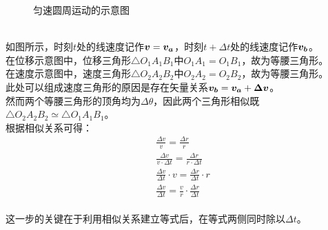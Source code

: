 \documentclass[UTF8]{ctexart}
\newcommand*{\veb}[1]{\vb*{#1}}
\begin{document}
\begin{figure}[h]
\begin{center}
{\begin{minipage}[t]{0.27\linewidth}
                \end{minipage}
            }
            \caption{匀速圆周运动的示意图}
        \end{center}
    \end{figure}\\
    如图所示，时刻$t$处的线速度记作$\veb{v}=\veb{v_a}$，时刻$t+\Delta t$处的线速度记作$\veb{v_b}$。\\[3mm]
    在位移示意图中，位移三角形$\triangle O_1A_1B_1$中$O_1A_1=O_1B_1$，故为等腰三角形。\\[3mm]
    在速度示意图中，速度三角形$\triangle O_2A_2B_2$中$O_2A_2=O_2B_2$，故为等腰三角形。\\[3mm]
    此处可以组成速度三角形的原因是存在矢量关系$\veb{v_b}=\veb{v_a}+\veb{\Delta v}$。\\[3mm]
    然而两个等腰三角形的顶角均为$\Delta \theta$，因此两个三角形相似既$\triangle O_2A_2B_2\simeq\triangle O_1A_1B_1$。\\[3mm]
    根据相似关系可得：
    \begin{align}
        &\frac{\Delta v}{v}=\frac{\Delta r}{r}\\[3mm]
        &\frac{\Delta v}{v\cdot\Delta t}=\frac{\Delta r}{r\cdot \Delta t}\\[3mm]
        &\frac{\Delta v}{\Delta t}\cdot v=\frac{\Delta r}{\Delta t}\cdot r\\[3mm]
        &\frac{\Delta v}{\Delta t}=\frac{v}{r}\cdot\frac{\Delta r}{\Delta t}
    \end{align}\\
    这一步的关键在于利用相似关系建立等式后，在等式两侧同时除以$\Delta t$。

\newpage
\end{document}
